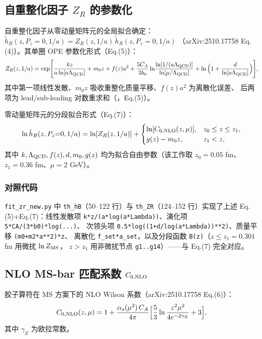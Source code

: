 \documentclass[UTF8]{ctexart}
\begin{document}
\subsection{自重整化因子 $Z_R$ 的参数化}

自重整化因子从零动量矩阵元的全局拟合确定：
$\tilde h_B(z,P_z{=}0,1/a) = Z_R(z,1/a)\,\tilde h_R(z,P_z{=}0,1/a)$
（arXiv:2510.17758 Eq.(4)）。其单圈 OPE 参数化形式（Eq.(5)）：
\begin{equation}
  Z_R(z,1/a) = \exp\!\Bigg[
    \frac{kz}{a\ln[a\Lambda_{\rm QCD}]} + m_0 z + f(z)a^2
    + \frac{5C_A}{3b_0}\ln\!\frac{\ln[1/(a\Lambda_{\rm QCD})]}{\ln[\mu/\Lambda_{\rm QCD}]}
    + \ln\Big(1 + \frac{d}{\ln[a\Lambda_{\rm QCD}]}\Big)\Bigg],
\end{equation}
其中第一项线性发散、$m_0 z$ 吸收重整化质量平移、$f(z)a^2$ 为离散化误差、
后两项为 lead/sub-leading 对数重求和（\texttt{}，Eq.(5)）。

零动量矩阵元的分段拟合形式（Eq.(7)）：
\begin{equation}
  \ln\tilde h_B(z,P_z{=}0,1/a) = \ln[Z_R(z,1/a)] + 
  \begin{cases} \ln[C_{0,\rm NLO}(z,\mu)], & z_0 \le z \le z_1,\\
                  g(z) - m_0 z, & z_1 < z,
  \end{cases}
\end{equation}
其中 $k,\Lambda_{\rm QCD}, f(z), d, m_0, g(z)$ 均为拟合自由参数（该工作取 $z_0=0.05$ fm、$z_1=0.36$ fm、$\mu=2$ GeV）。
\subsubsection*{对照代码}
\texttt{fit\_zr\_new.py} 中 \texttt{th\_hB}（50--122 行）与 \texttt{th\_ZR}（124--152 行）实现了上述
Eq.(5)+Eq.(7)：线性发散项 \texttt{k*z/(a*log(a*Lambda))}、演化项 \texttt{5*CA/(3*b0)*log(...)}、
次领头项 \texttt{0.5*log((1+d/log(a*Lambda))**2)}、质量平移 \texttt{(m0+m2*a**2)*z}、
离散化 \texttt{f\_set*a\_set}，以及分段函数 \texttt{B(z)}（$z\le z_1=0.301$ fm 用微扰 $\ln Z_{\rm MS}$，
$z>z_1$ 用非微扰节点 \texttt{g1..g14}）——与 Eq.(7) 完全对应。

\subsection{NLO MS-bar 匹配系数 $C_{0,\rm NLO}$}

胶子算符在 MS 方案下的 NLO Wilson 系数（arXiv:2510.17758 Eq.(6)）：
\begin{equation}
  C_{0,\rm NLO}(z,\mu) = 1 + \frac{\alpha_s(\mu^2)\,C_A}{4\pi}\Big[
    \frac{5}{3}\ln\frac{z^2\mu^2}{4e^{-2\gamma_E}} + 3\Big],
\end{equation}
其中 $\gamma_E$ 为欧拉常数。
\end{document}
